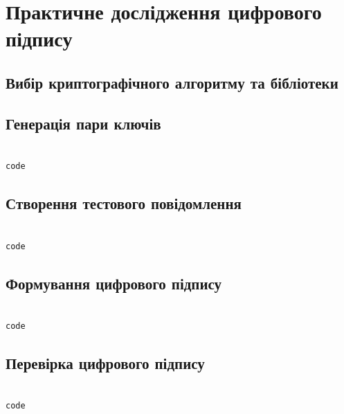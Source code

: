 \section{Практичне дослідження цифрового підпису}

\subsection{Вибір криптографічного алгоритму та бібліотеки}


\subsection{Генерація пари ключів}


\begin{lstlisting}[language=Python]

code

\end{lstlisting}


\subsection{Створення тестового повідомлення}


\begin{lstlisting}[language=Python]

code

\end{lstlisting}



\subsection{Формування цифрового підпису}


\begin{lstlisting}[language=Python]

code

\end{lstlisting}



\subsection{Перевірка цифрового підпису}


\begin{lstlisting}[language=Python]

code

\end{lstlisting}



